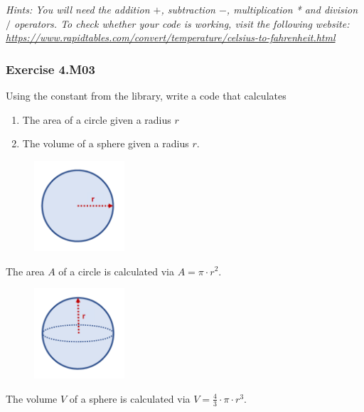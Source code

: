 \textit{Hints:
You will need the addition $+$, subtraction $-$, multiplication * and division $/$ operators. To
check whether your code is working, visit the following website:
\url{https://www.rapidtables.com/convert/temperature/celsius-to-fahrenheit.html}}\\[1cm]



\subsubsection*{Exercise 4.M03 \red{[M]}}
Using the {} constant from the {} library, write a code that calculates
\begin{enumerate}[label=(\alph*)]
	\item The area of a circle given a radius $r$
	\item The volume of a sphere given a radius $r$.
\end{enumerate}

\begin{figure}[H]
		\centering
		\includegraphics[width=0.3\textwidth]{../IMG/4M03_1.png} 
\end{figure}

The area $A$ of a circle is calculated via $A = \pi \cdot r^2$.


\begin{figure}[H]
		\centering
		\includegraphics[width=0.3\textwidth]{../IMG/4M03_2.png} 
\end{figure}

The volume $V$ of a sphere is calculated via $V = \frac{4}{3} \cdot \pi \cdot r^3$.\\

